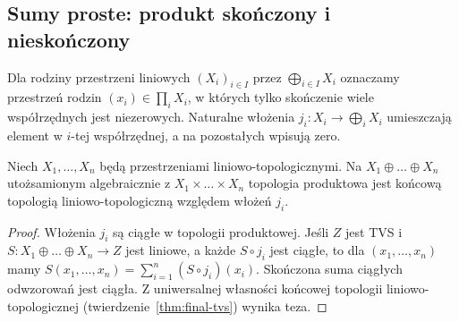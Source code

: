 \subsection{Sumy proste: produkt skończony i nieskończony}

\begin{definicja}
Dla rodziny przestrzeni liniowych $(X_i)_{i\in I}$
przez $\bigoplus_{i\in I}X_i$ oznaczamy przestrzeń
rodzin $(x_i)\in\prod_iX_i$, w których tylko skończenie
wiele współrzędnych jest niezerowych. Naturalne włożenia
$j_i:X_i\to\bigoplus_iX_i$ umieszczają element w $i$-tej
współrzędnej, a na pozostałych wpisują zero.
\end{definicja}

\begin{twierdzenie}
Niech $X_1,\dots,X_n$ będą przestrzeniami liniowo-topologicznymi.
Na $X_1\oplus\dots\oplus X_n$ utożsamionym algebraicznie
z $X_1\times\dots\times X_n$ topologia produktowa jest
końcową topologią liniowo-topologiczną względem włożeń $j_i$.
\end{twierdzenie}
\begin{proof}
Włożenia $j_i$ są ciągłe w topologii produktowej.
Jeśli $Z$ jest TVS i $S:X_1\oplus\dots\oplus X_n\to Z$
jest liniowe, a każde $S\circ j_i$ jest ciągłe,
to dla $(x_1,\dots,x_n)$ mamy
$S(x_1,\dots,x_n)=\sum_{i=1}^n(S\circ j_i)(x_i)$.
Skończona suma ciągłych odwzorowań jest ciągła.
Z uniwersalnej własności końcowej topologii
liniowo-topologicznej (twierdzenie~\ref{thm:final-tvs})
wynika teza.
\end{proof}

